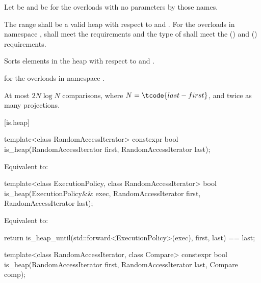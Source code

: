 \begin{itemdescr}
\pnum
Let  be 
and  be 
for the overloads with no parameters by those names.

\pnum
\requires
The range  shall be
a valid heap with respect to  and .
For the overloads in namespace ,
 shall meet
the  requirements and
the type of  shall meet
the  () and
 () requirements.

\pnum
\effects
Sorts elements in the heap 
with respect to  and .

\pnum
\returns
{} for the overloads in namespace .

\pnum
\complexity
At most $2N \log N$ comparisons, where $N = \tcode{last - first}$, and
twice as many projections.
\end{itemdescr}

[is.heap]{}

%
\begin{itemdecl}
template<class RandomAccessIterator>
  constexpr bool is_heap(RandomAccessIterator first, RandomAccessIterator last);
\end{itemdecl}

\begin{itemdescr}
\pnum
\effects
Equivalent to: 
\end{itemdescr}

%
\begin{itemdecl}
template<class ExecutionPolicy, class RandomAccessIterator>
  bool is_heap(ExecutionPolicy&& exec,
               RandomAccessIterator first, RandomAccessIterator last);
\end{itemdecl}

\begin{itemdescr}
\pnum
\effects
Equivalent to:
\begin{codeblock}
return is_heap_until(std::forward<ExecutionPolicy>(exec), first, last) == last;
\end{codeblock}
\end{itemdescr}

%
\begin{itemdecl}
template<class RandomAccessIterator, class Compare>
  constexpr bool is_heap(RandomAccessIterator first, RandomAccessIterator last,
                         Compare comp);
\end{itemdecl}

